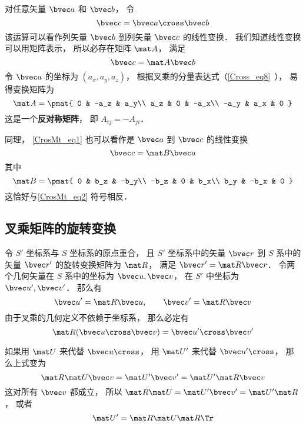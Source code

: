 
对任意矢量 $\bvec a$ 和 $\bvec b$， 令
\begin{equation}\label{CrosMt_eq1}
\bvec c = \bvec a \cross \bvec b
\end{equation}
该运算可以看作列矢量 $\bvec b$ 到列矢量 $\bvec c$ 的线性变换． 我们知道线性变换可以用矩阵表示， 所以必存在矩阵 $\mat A$， 满足
\begin{equation}\label{CrosMt_eq3}
\bvec c = \mat A \bvec b
\end{equation}
令 $\bvec a$ 的坐标为 $(a_x, a_y, a_z)$， 根据叉乘的分量表达式（\autoref{Cross_eq8}~）， 易得变换矩阵为
\begin{equation}\label{CrosMt_eq2}
\mat A = \pmat{
0 & -a_z & a_y\\
a_z & 0 & -a_x\\
-a_y & a_x & 0
}
\end{equation}
这是一个\textbf{反对称矩阵}， 即 $A_{ij} = -A_{ji}$．

同理， \autoref{CrosMt_eq1} 也可以看作是 $\bvec a$ 到 $\bvec c$ 的线性变换
\begin{equation}
\bvec c = \mat B \bvec a
\end{equation}
其中
\begin{equation}
\mat B = \pmat{
0 & b_z & -b_y\\
-b_z & 0 & b_x\\
b_y & -b_x & 0
}
\end{equation}
这恰好与\autoref{CrosMt_eq2} 符号相反．

\subsection{叉乘矩阵的旋转变换}
令 $S'$ 坐标系与 $S$ 坐标系的原点重合， 且 $S'$ 坐标系中的矢量 $\bvec r$ 到 $S$ 系中的矢量 $\bvec r'$ 的旋转变换矩阵为 $\mat R$， 满足 $\bvec r' = \mat R\bvec r$． 令两个几何矢量在 $S$ 系中的坐标为 $\bvec u, \bvec v$， 在 $S'$ 中坐标为 $\bvec u', \bvec v'$． 那么有
\begin{equation}
\bvec u' = \mat R\bvec u, \qquad
\bvec v' = \mat R\bvec v
\end{equation}
由于叉乘的几何定义不依赖于坐标系， 那么必定有
\begin{equation}
\mat R(\bvec u\cross \bvec v) = \bvec u'\cross \bvec v'
\end{equation}

如果用 $\mat U$ 来代替 $\bvec u\cross$， 用 $\mat U'$ 来代替 $\bvec u'\cross$， 那么上式变为
\begin{equation}
\mat R \mat U \bvec v = \mat U' \bvec v' = \mat U'\mat R\bvec v
\end{equation}
这对所有 $\bvec v$ 都成立， 所以 $\mat R \mat U = \mat U' \bvec v' = \mat U'\mat R$， 或者
\begin{equation}
\mat U' = \mat R \mat U \mat R\Tr
\end{equation}

